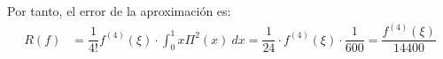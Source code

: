 \begin{ejercicio}
\begin{enumerate}
        Por tanto, el error de la aproximación es:
        \begin{align*}
            R(f) &= \dfrac{1}{4!}f^{(4)}(\xi)\cdot \int_0^1 x\Pi^2(x)\ dx
            = \dfrac{1}{24}\cdot f^{(4)}(\xi)\cdot \dfrac{1}{600}
            = \dfrac{f^{(4)}(\xi)}{14400}
        \end{align*}

    \end{enumerate}
\end{ejercicio}
